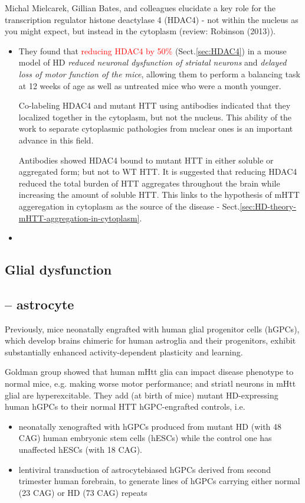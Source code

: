Michal Mielcarek, Gillian Bates, and colleagues elucidate a key role for the
transcription regulator histone deactylase 4 (HDAC4) - not within the nucleus as
you might expect, but instead in the cytoplasm (review: Robinson (2013)).
\begin{itemize}
  
  \item  They found that \textcolor{red}{reducing HDAC4 by 50\% }
  (Sect.\ref{sec:HDAC4}) in a mouse model of HD {\it reduced neuronal
  dysfunction of striatal neurons} and {\it delayed loss of motor function of
  the mice}, allowing them to perform a balancing task at 12 weeks of age as
  well as untreated mice who were a month younger.

Co-labeling HDAC4 and mutant HTT using antibodies indicated that they localized
together in the cytoplasm, but not the nucleus.
This ability of the work to separate cytoplasmic pathologies from nuclear ones
is an important advance in this field.

Antibodies showed HDAC4 bound to mutant HTT in either soluble or aggregated
form; but not to WT HTT. 
It is suggested that reducing HDAC4 reduced the total burden of HTT aggregates
throughout the brain while increasing the amount of soluble HTT. This links to
the hypothesis of mHTT aggeregation in cytoplasm as the source of the disease -
Sect.\ref{sec:HD-theory-mHTT-aggregation-in-cytoplasm}.

  \item 
\end{itemize}

\subsection{Glial dysfunction}
\label{sec:HD-role-of-glial}


\subsection{-- astrocyte}

Previously, mice neonatally engrafted with human glial progenitor cells (hGPCs),
which develop brains chimeric for human astroglia and their progenitors,
exhibit substantially enhanced activity-dependent plasticity and learning.

Goldman group showed that human mHtt glia can impact disease phenotype to normal
mice, e.g. making worse motor performance; and striatl neurons in mHtt glial are
hyperexcitable. They add (at birth of mice) mutant HD-expressing human hGPCs to
their normal HTT hGPC-engrafted controls, i.e.
\begin{itemize}
  \item   neonatally xenografted with hGPCs produced from mutant HD (with 48 CAG) human
embryonic stem cells (hESCs) while the control one has unaffected hESCs (with 18
CAG).
  
  \item lentiviral transduction of astrocytebiased hGPCs derived from second
  trimester human forebrain, to generate lines of hGPCs carrying either normal
  (23 CAG) or HD (73 CAG) repeats
\end{itemize}

